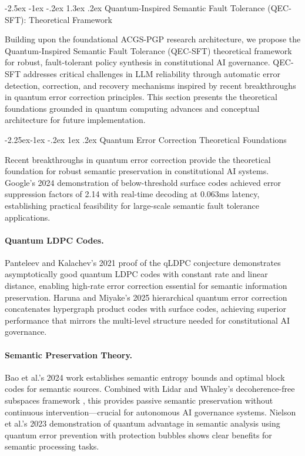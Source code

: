 \documentclass[manuscript,screen,9pt]{acmart}
\makeatletter
\renewcommand\section{\@startsection{section}{1}{\z@}%
  {-2.5ex \@plus -1ex \@minus -.2ex}%
  {1.3ex \@plus.2ex}%
  {\normalfont\Large\bfseries}}
\renewcommand\subsection{\@startsection{subsection}{2}{\z@}%
  {-2.25ex\@plus -1ex \@minus -.2ex}%
  {1ex \@plus .2ex}%
  {\normalfont\large\bfseries}}
\makeatother
\begin{document}
\section{Quantum-Inspired Semantic Fault Tolerance (QEC-SFT): Theoretical Framework}
\label{sec:qec_sft}

Building upon the foundational ACGS-PGP research architecture, we propose the Quantum-Inspired Semantic Fault Tolerance (QEC-SFT) theoretical framework for robust, fault-tolerant policy synthesis in constitutional AI governance. QEC-SFT addresses critical challenges in LLM reliability through automatic error detection, correction, and recovery mechanisms inspired by recent breakthroughs in quantum error correction principles. This section presents the theoretical foundations grounded in quantum computing advances and conceptual architecture for future implementation.

\subsection{Quantum Error Correction Theoretical Foundations}
\label{subsec:qec_foundations}

Recent breakthroughs in quantum error correction provide the theoretical foundation for robust semantic preservation in constitutional AI systems. Google's 2024 demonstration of below-threshold surface codes \cite{Acharya2024QuantumErrorCorrection} achieved error suppression factors of 2.14 with real-time decoding at 0.063ms latency, establishing practical feasibility for large-scale semantic fault tolerance applications.

\paragraph{Quantum LDPC Codes.} Panteleev and Kalachev's 2021 proof of the qLDPC conjecture \cite{Panteleev2021QuantumLDPC} demonstrates asymptotically good quantum LDPC codes with constant rate and linear distance, enabling high-rate error correction essential for semantic information preservation. Haruna and Miyake's 2025 hierarchical quantum error correction \cite{Haruna2025HierarchicalQEC} concatenates hypergraph product codes with surface codes, achieving superior performance that mirrors the multi-level structure needed for constitutional AI governance.

\paragraph{Semantic Preservation Theory.} Bao et al.'s 2024 work \cite{Bao2024SemanticEntropy} establishes semantic entropy bounds and optimal block codes for semantic sources. Combined with Lidar and Whaley's decoherence-free subspaces framework \cite{Lidar2024DecoherenceFree}, this provides passive semantic preservation without continuous intervention—crucial for autonomous AI governance systems. Nielson et al.'s 2023 demonstration \cite{Nielson2023QuantumAdvantage} of quantum advantage in semantic analysis using quantum error prevention with protection bubbles shows clear benefits for semantic processing tasks.
\end{document}
